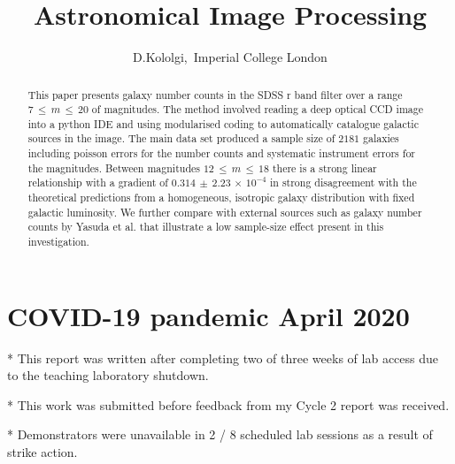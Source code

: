\documentclass[journal]{IEEEtran}
\begin{document}
\title{Astronomical Image Processing}
\author{D.Kololgi,~{Imperial College London}}

\maketitle

\section*{COVID-19 pandemic April 2020}
* This report was written after completing two of three weeks of lab 
access due to the teaching laboratory shutdown.

* This work was submitted before feedback from my Cycle 2 report was 
received.

* Demonstrators were unavailable in 2 / 8 scheduled lab sessions as a 
result of strike action. \newline

\begin{abstract}
This paper presents galaxy number counts in the SDSS r band filter over a range $7\,\leq\,m\,\leq\,20$ of magnitudes. The method involved reading a deep optical CCD image into a python IDE and using modularised coding to automatically catalogue galactic sources in the image. The main data set produced a sample size of $2181$ galaxies including poisson errors for the number counts and systematic instrument errors for the magnitudes. Between magnitudes $12\,\leq\,m\,\leq\,18$ there is a strong linear relationship with a gradient of $0.314\,\pm\,2.23\,\times\,10^{-4}$ in strong disagreement with the theoretical predictions from a homogeneous, isotropic galaxy distribution with fixed galactic luminosity. We further compare with external sources such as galaxy number counts by Yasuda et al. that illustrate a low sample-size effect present in this investigation. 
 
\end{abstract}
\end{document}
